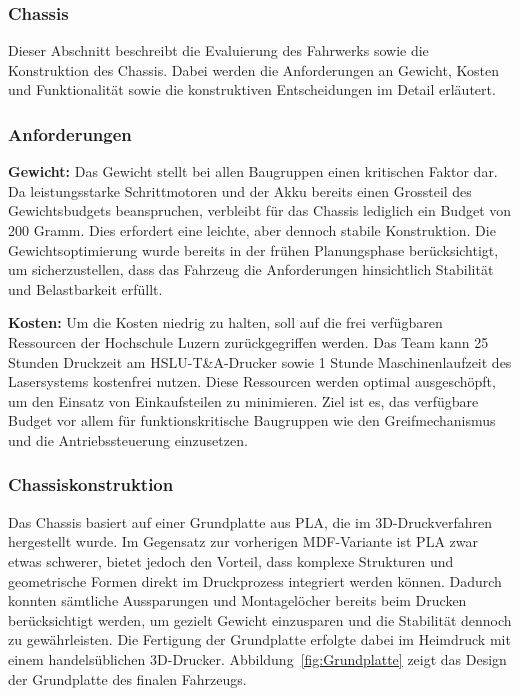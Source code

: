 \documentclass[main.tex]{subfiles} %
\begin{document}

\subsubsection{Chassis}

Dieser Abschnitt beschreibt die Evaluierung des Fahrwerks sowie die
Konstruktion des Chassis. Dabei werden die Anforderungen an Gewicht, Kosten und
Funktionalität sowie die konstruktiven Entscheidungen im Detail erläutert.

\subsubsection*{Anforderungen}

\textbf{Gewicht:} \newline
Das Gewicht stellt bei allen Baugruppen einen kritischen Faktor dar. Da
leistungsstarke Schrittmotoren und der Akku bereits einen Grossteil des
Gewichtsbudgets beanspruchen, verbleibt für das Chassis lediglich ein Budget von
200 Gramm. Dies erfordert eine leichte, aber dennoch stabile Konstruktion. Die
Gewichtsoptimierung wurde bereits in der frühen Planungsphase berücksichtigt, um
sicherzustellen, dass das Fahrzeug die Anforderungen hinsichtlich Stabilität und
Belastbarkeit erfüllt.

\textbf{Kosten:} \newline
Um die Kosten niedrig zu halten, soll auf die frei verfügbaren Ressourcen der
Hochschule Luzern zurückgegriffen werden. Das Team kann 25 Stunden Druckzeit am
HSLU-T\&A-Drucker sowie 1 Stunde Maschinenlaufzeit des Lasersystems kostenfrei
nutzen. Diese Ressourcen werden optimal ausgeschöpft, um den Einsatz von
Einkaufsteilen zu minimieren. Ziel ist es, das verfügbare Budget vor allem für
funktionskritische Baugruppen wie den Greifmechanismus und die Antriebssteuerung
einzusetzen.

\subsubsection*{Chassiskonstruktion}

Das Chassis basiert auf einer Grundplatte aus PLA, die im 3D-Druckverfahren hergestellt wurde. 
Im Gegensatz zur vorherigen MDF-Variante ist PLA zwar etwas schwerer, bietet jedoch den Vorteil, 
dass komplexe Strukturen und geometrische Formen direkt im Druckprozess integriert werden können. 
Dadurch konnten sämtliche Aussparungen und Montagelöcher bereits beim Drucken berücksichtigt werden, 
um gezielt Gewicht einzusparen und die Stabilität dennoch zu gewährleisten. 
Die Fertigung der Grundplatte erfolgte dabei im Heimdruck mit einem handelsüblichen 3D-Drucker. 
Abbildung~\ref{fig:Grundplatte} zeigt das Design der Grundplatte des finalen Fahrzeugs.
\end{document}
